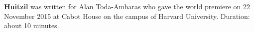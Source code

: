 \textbf{Huitzil} was written for Alan Toda-Ambaras who gave the world premiere
on 22 November 2015 at Cabot House on the campus of Harvard University.
Duration: about 10 minutes.
